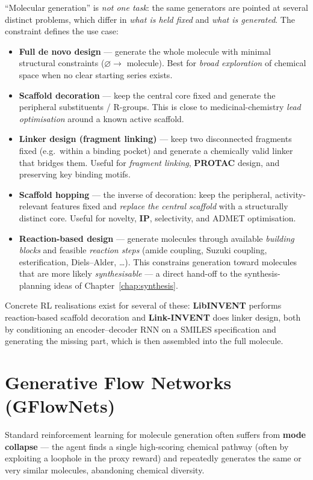 \documentclass[11pt, oneside]{book}
\begin{document}
``Molecular generation'' is \emph{not one task}: the same generators are pointed at
several distinct problems, which differ in \emph{what is held fixed} and \emph{what is
generated}. The constraint defines the use case:
\begin{itemize}
  \item \textbf{Full de novo design} --- generate the whole molecule with minimal
        structural constraints ($\varnothing \to$ molecule). Best for \emph{broad
        exploration} of chemical space when no clear starting series exists.
  \item \textbf{Scaffold decoration} --- keep the central core fixed and generate the
        peripheral substituents / R-groups. This is close to medicinal-chemistry
        \emph{lead optimisation} around a known active scaffold.
  \item \textbf{Linker design (fragment linking)} --- keep two disconnected fragments
        fixed (e.g.\ within a binding pocket) and generate a chemically valid linker
        that bridges them. Useful for \emph{fragment linking}, \textbf{PROTAC} design,
        and preserving key binding motifs.
  \item \textbf{Scaffold hopping} --- the inverse of decoration: keep the peripheral,
        activity-relevant features fixed and \emph{replace the central scaffold} with a
        structurally distinct core. Useful for novelty, \textbf{IP}, selectivity, and
        ADMET optimisation.
  \item \textbf{Reaction-based design} --- generate molecules through available
        \emph{building blocks} and feasible \emph{reaction steps} (amide coupling,
        Suzuki coupling, esterification, Diels--Alder, \dots). This constrains
        generation toward molecules that are more likely \emph{synthesisable} --- a
        direct hand-off to the synthesis-planning ideas of
        Chapter~\ref{chap:synthesis}.
\end{itemize}
Concrete RL realisations exist for several of these: \textbf{LibINVENT} performs
reaction-based scaffold decoration and \textbf{Link-INVENT} does linker design, both by
conditioning an encoder--decoder RNN on a SMILES specification and generating the
missing part, which is then assembled into the full molecule.

\vspace{-0.5 cm}

\section{Generative Flow Networks (GFlowNets)}
Standard reinforcement learning for molecule generation often suffers from \textbf{mode collapse} --- the agent finds a single high-scoring chemical pathway (often by exploiting a loophole in the proxy reward) and repeatedly generates the same or very similar molecules, abandoning chemical diversity.
\end{document}
